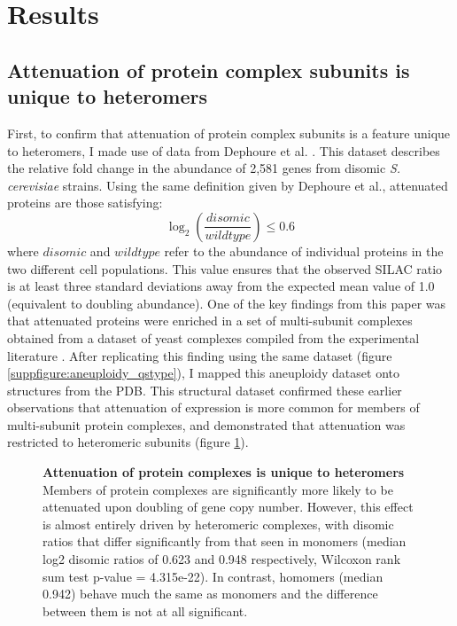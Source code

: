 \documentclass[a4paper,11pt,twoside,openright]{scrbook}
\begin{document}
\clearpage

\section{Results}

\subsection{Attenuation of protein complex subunits is unique to heteromers}
First, to confirm that attenuation of protein complex subunits is a feature unique to heteromers, I made use of data from Dephoure et al. \cite{Dephoure2014}. This dataset describes the relative fold change in the abundance of 2,581 genes from disomic \textit{S. cerevisiae} strains. Using the same definition given by Dephoure et al., attenuated proteins are those satisfying:
\begin{displaymath}
    \log_{2} \left( \frac{disomic}{wildtype} \right) \leq 0.6
\end{displaymath}
where $disomic$ and $wildtype$ refer to the abundance of individual proteins in the two different cell populations. This value ensures that the observed SILAC ratio is at least three standard deviations away from the expected mean value of 1.0 (equivalent to doubling abundance). One of the key findings from this paper was that attenuated proteins were enriched in a set of multi-subunit complexes obtained from a dataset of yeast complexes compiled from the experimental literature \cite{Pu2009}. After replicating this finding using the same dataset (figure \ref{suppfigure:aneuploidy_qstype}), I mapped this aneuploidy dataset onto structures from the PDB. This structural dataset confirmed these earlier observations that attenuation of expression is more common for members of multi-subunit protein complexes, and demonstrated that attenuation was restricted to heteromeric subunits (figure \ref{figure:aneuploidy_qstype}).

\begin{figure}[h]
    \caption[Attenuation of protein complexes is unique to heteromers]{\sffamily \textbf{Attenuation of protein complexes is unique to heteromers} \\ \small Members of protein complexes are significantly more likely to be attenuated upon doubling of gene copy number. However, this effect is almost entirely driven by heteromeric complexes, with disomic ratios that differ significantly from that seen in monomers (median log2 disomic ratios of 0.623 and 0.948 respectively, Wilcoxon rank sum test p-value = 4.315e-22). In contrast, homomers (median 0.942) behave much the same as monomers and the difference between them is not at all significant.}
    \label{figure:aneuploidy_qstype}
\end{figure}
\end{document}
